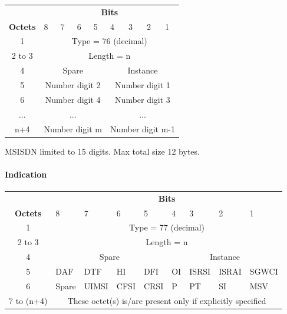 \begin{tabular}{c|p{1cm}|p{1cm}|p{1cm}|p{1cm}|p{1cm}|p{1cm}|p{1cm}|p{1cm}|}
\multicolumn{1}{c}{} & \multicolumn{8}{c}{\textbf{Bits}} \\
\cline{2-9} \textbf{Octets} & 8 & 7 & 6 & 5 & 4 & 3 & 2 & 1 \\ 
\cline{2-9} 1 & \multicolumn{8}{c|}{Type = 76 (decimal)} \\ 
\cline{2-9} 2 to 3 & \multicolumn{8}{c|}{Length = n}  \\ 
\cline{2-9} 4 & \multicolumn{4}{c|}{Spare} & \multicolumn{4}{c|}{Instance} \\ 
\cline{2-9} 5 & \multicolumn{4}{c|}{Number digit 2} & \multicolumn{4}{c|}{Number digit 1} \\ 
\cline{2-9} 6 & \multicolumn{4}{c|}{Number digit 4} & \multicolumn{4}{c|}{Number digit 3} \\ 
\cline{2-9} ... & \multicolumn{4}{c|}{...} & \multicolumn{4}{c|}{...} \\ 
\cline{2-9} n+4 & \multicolumn{4}{c|}{Number digit m} & \multicolumn{4}{c|}{Number digit m-1} \\ 
\cline{2-9}
\end{tabular} 

MSISDN limited to 15 digits. Max total size 12 bytes.


\paragraph{Indication}

\begin{center}
\begin{tabular}{c|p{1cm}|p{1cm}|p{1cm}|p{1cm}|p{1cm}|p{1cm}|p{1cm}|p{1cm}|}
\multicolumn{1}{c}{} & \multicolumn{8}{c}{\textbf{Bits}} \\
\cline{2-9} \textbf{Octets} & 8 & 7 & 6 & 5 & 4 & 3 & 2 & 1 \\ 
\cline{2-9} 1 & \multicolumn{8}{c|}{Type = 77 (decimal)} \\ 
\cline{2-9} 2 to 3 & \multicolumn{8}{c|}{Length = n}  \\ 
\cline{2-9} 4 & \multicolumn{4}{c|}{Spare} & \multicolumn{4}{c|}{Instance} \\ 
\cline{2-9} 5 & DAF & DTF & HI & DFI & OI & ISRSI & ISRAI & SGWCI \\ 
\cline{2-9} 6 & Spare & UIMSI & CFSI & CRSI & P & PT & SI & MSV \\ 
\cline{2-9} 7 to (n+4) & \multicolumn{8}{c|}{These octet(s) is/are present only if explicitly specified} \\ 
\cline{2-9}
\end{tabular}
\end{center}

